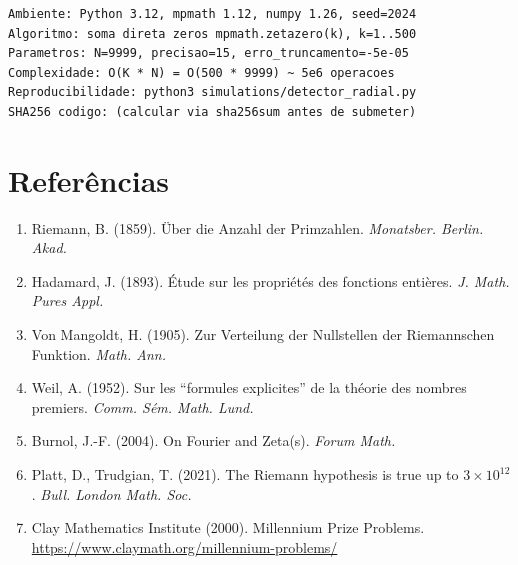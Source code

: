 \documentclass[12pt,a4paper]{article}
\theoremstyle{definition}
\begin{document}
\begin{verbatim}
Ambiente: Python 3.12, mpmath 1.12, numpy 1.26, seed=2024
Algoritmo: soma direta zeros mpmath.zetazero(k), k=1..500
Parametros: N=9999, precisao=15, erro_truncamento=-5e-05
Complexidade: O(K * N) = O(500 * 9999) ~ 5e6 operacoes
Reproducibilidade: python3 simulations/detector_radial.py
SHA256 codigo: (calcular via sha256sum antes de submeter)
\end{verbatim}

\section*{Referências}

\begin{enumerate}
  \item Riemann, B. (1859). Über die Anzahl der Primzahlen.
        \emph{Monatsber. Berlin. Akad.}
  \item Hadamard, J. (1893). Étude sur les propriétés des fonctions
        entières. \emph{J. Math. Pures Appl.}
  \item Von Mangoldt, H. (1905). Zur Verteilung der Nullstellen der
        Riemannschen Funktion. \emph{Math. Ann.}
  \item Weil, A. (1952). Sur les ``formules explicites'' de la théorie
        des nombres premiers. \emph{Comm. Sém. Math. Lund.}
  \item Burnol, J.-F. (2004). On Fourier and Zeta(s).
        \emph{Forum Math.}
  \item Platt, D., Trudgian, T. (2021). The Riemann hypothesis is true
        up to $3 \times 10^{12}$. \emph{Bull. London Math. Soc.}
  \item Clay Mathematics Institute (2000). Millennium Prize Problems.
        \url{https://www.claymath.org/millennium-problems/}
\end{enumerate}
\end{document}

